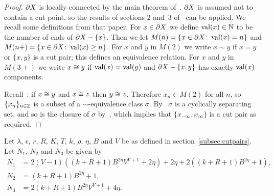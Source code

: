 \begin{proof} $\partial X$ is locally connected by the main theorem
of~\cite{bowditch99b}. $\partial X$ is assumed not to contain a cut point,
so the results of sections 2 and~3 of~\cite{bowditch98} can be applied. We
recall some definitions from that paper. For $x \in \partial X$ we define
$\operatorname{\mathrm{val}}(x) \in \mathbb{N}$ to be the number of ends of $\partial X - \{x\}$.
Then we let $M(n) = \{x \in \partial X \colon \operatorname{\mathrm{val}}(x) = n\}$ and $M(n{+}) =
\{x \in \partial X \colon \operatorname{\mathrm{val}}(x) \geq n\}$. For $x$ and $y$ in $M(2)$ we
write $x \sim y$ if $x = y$ or $\{x, y\}$ is a cut pair; this defines an
equivalence relation. For $x$ and $y$ in $M(3{+})$ we write $x \cong y$ if
$\operatorname{\mathrm{val}}(x) = \operatorname{\mathrm{val}}(y)$ and $\partial X - \{x, y\}$ has exactly $\operatorname{\mathrm{val}}(x)$
components.

Recall~\cite[Lemma 3.8]{bowditch98}: if $x \cong y$ and $x \cong z$ then $y
\cong z$. Therefore $x_n \in M(2)$ for all $n$, so $\{x_n\}_{n \in
\mathbb{Z}}$ is a subset of a $\sim$-equivalence class $\sigma$. By~\cite[Lem.\
3.2]{bowditch98} $\sigma$ is a cyclically separating set, and so is the closure
of $\sigma$ by~\cite[Lem.\ 2.2]{bowditch98}, which implies that $\{x_{-\infty},
x_\infty\}$ is a cut pair as required.  \end{proof}

Let $\lambda$,
$\epsilon$, $r$, $R$, $K$, $T$, $k$, $\rho$, $\eta$, $B$ and $V$ be as defined
in section~\ref{subsec:cutpairs}. Let $N_1$, $N_2$ and $N_3$ be given by
\begin{align*} 
  N_1 &= 2(V-1)((k+R+1)B^{2\eta}V^{V+1} + 2\eta) + 2\eta + 2((k+R+1)B^{2\eta} + 1),\\
  N_2 &= (k+R+1)B^{2\eta} + 1,\\
  N_3 &= 2(k + R + 1)B^{2\eta}V^{V+1} + 4\eta.
\end{align*}

